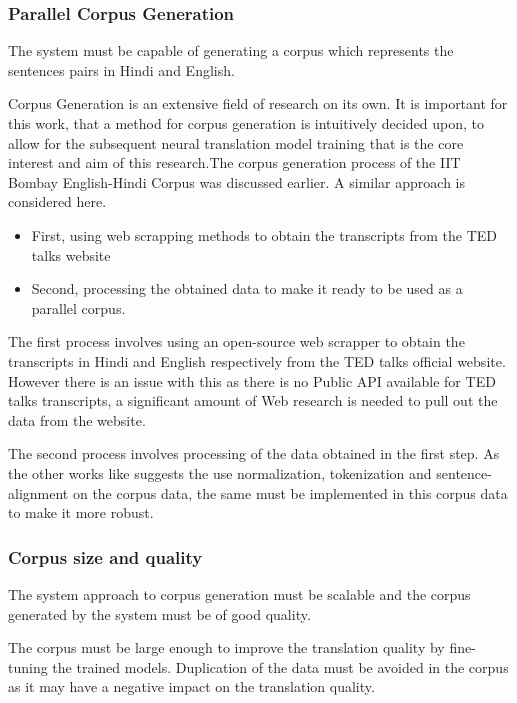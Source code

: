 \subsubsection{Parallel Corpus Generation}

The system must be capable of generating a corpus which represents the sentences pairs in Hindi and English. 

Corpus Generation is an extensive field of research on its own. It is important for this work, that a method for corpus generation is intuitively decided upon, to allow for the subsequent neural translation model training that is the core interest and aim of this research.The corpus generation process of the IIT Bombay English-Hindi Corpus \citep{Kunchukuttan2018TheIB} was discussed earlier. A similar approach is considered here.

\begin{itemize}
    \item First, using web scrapping methods to obtain the transcripts from the TED talks website
    \item Second, processing the obtained data to make it ready to be used as a parallel corpus.
\end{itemize}

The first process involves using an open-source web scrapper to obtain the transcripts in Hindi and English respectively from the TED talks official website. However there is an issue with this as there is no Public API available for TED talks transcripts, a significant amount of Web research is needed to pull out the data from the website.

The second process involves processing of the data obtained in the first step. As the other works like \cite{Kunchukuttan2018TheIB} suggests the use normalization, tokenization and sentence-alignment on the corpus data, the same must be implemented in this corpus data to make it more robust.

\subsubsection{Corpus size and quality}

The system approach to corpus generation must be scalable and the corpus generated by the system must be of good quality.

The corpus must be large enough to improve the translation quality by fine-tuning the trained models. Duplication of the data must be avoided in the corpus as it may have a negative impact on the translation quality.

